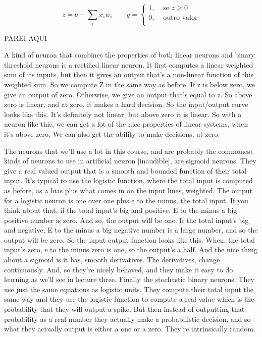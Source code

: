 \begin{multicols}{2}
\begin{footnotesize}
\begin{equation}
z = b + \sum_i x_i w_i
\qquad
y = \left\{
    \begin{array}{ll}
    1, & \mbox{ se } z\geq0 \\
    0, & \mbox{ outro valor} \\
    \end{array}
    \right.
\label{eq:binary-threshold-formulation2}
\end{equation}


PAREI AQUI


A kind of neuron that combines the properties of both linear neurons and binary threshold neurons is a rectified linear neuron. It first computes a linear weighted sum of its inputs, but then it gives an output that's a non-linear function of this weighted sum. So we compute Z in the same way as before. If z is below zero, we give an output of zero. Otherwise, we give an output that's equal to z. So above zero is linear, and at zero, it makes a hard decision. So the input/output curve looks like this. It's definitely not linear, but above zero it is linear. So with a neuron like this, we can get a lot of the nice properties of linear systems, when it's above zero. We can also get the ability to make decisions, at zero.

The neurons that we'll use a lot in this course, and are probably the commonest kinds of neurons to use in artificial neuron [inaudible], are sigmoid neurons. They give a real valued output that is a smooth and bounded function of their total input. It's typical to use the logistic function, where the total input is computed as before, as a bias plus what comes in on the input lines, weighted. The output for a logistic neuron is one over one plus e to the minus, the total input. If you think about that, if the total input's big and positive. E to the minus a big positive number is zero. And so, the output will be one. If the total input's big and negative, E to the minus a big negative number is a large number, and so the output will be zero. So the input output function looks like this. When, the total input's zero, e to the minus zero is one, so the output's a half. And the nice thing about a sigmoid is it has, smooth derivatives. The derivatives, change continuously. And, so they're nicely behaved, and they make it easy to do learning as we'll see in lecture three. Finally the stochastic binary neurons. They use just the same equations as logistic units. They compute their total input the same way and they use the logistic function to compute a real value which is the probability that they will output a spike. But then instead of outputting that probability as a real number they actually make a probabilistic decision, and so what they actually output is either a one or a zero. They're intrinsically random.


\end{footnotesize}
\end{multicols}
